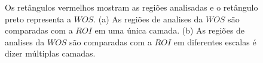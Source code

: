 \begin{figure}[H]
\centering
  \caption{Os retângulos vermelhos mostram as regiões analisadas e o retângulo preto representa a $WOS$. 
  (a) As regiões de analises da $WOS$ são comparadas com a $ROI$ em uma única camada. 
  (b) As regiões de analises da $WOS$ são comparadas com a $ROI$ em diferentes escalas é dizer múltiplas camadas.}
  \label{fig:multires}
\end{figure}

